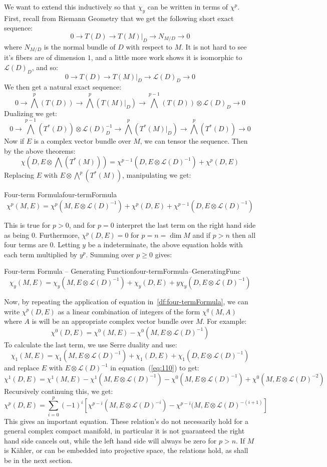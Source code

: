 \documentclass{book}
\newcommand{\CL}{{\mathcal{L}}}
\begin{document}
We want to extend this inductively so that $\chi_y$ can be written in terms of $\chi^p$. First, recall from
Riemann Geometry that we get the following short exact sequence:
\[
  0 \to T(D) \to T(M)|_D \to N_{M/D} \to 0
\]
where $N_{M/D}$ is the normal bundle of $D$ with respect to $M$. It is not hard to see it's fibers are of
dimension $1$, and a little more work shows it is isomorphic to $\CL(D)_D$, and so:
\[
  0 \to T(D) \to T(M)|_D \to \CL(D)_D \to 0
\]
We then get a natural exact sequence:
\[
0 \to \bigwedge^p\left(T(D)\right) \to \bigwedge^p(T(M)|_D) \to \bigwedge^{p-1}(T(D)) \otimes \CL(D)_D\to 0
\]
Dualizing we get:
\[
  0 \to \bigwedge^{p-1}(T^*(D))\otimes \CL(D)_D^{-1} \to \bigwedge^p(T^*(M)|_D) \to \bigwedge^p(T^*(D)) \to 0
\]
Now if $E$ is a complex vector bundle over $M$, we can tensor the sequence. Then by the above theorems:
\[
  \chi\left(D, E\otimes \bigwedge(T^*(M))\right) = \chi^{p-1}(D, E\otimes \CL(D)^{-1}) + \chi^p(D, E)
\]
Replacing $E$ with $E\otimes \bigwedge^p(T^*(M))$, manipulating we get:
\begin{defn}{Four-term Formula}{four-termFormula}
  \[
  \chi^p(M,E) = \chi^p(M, E\otimes \CL(D)^{-1}) + \chi^p(D, E) + \chi^{p-1}(D, E\otimes \CL(D)^{-1})
  \]
\end{defn}
This is true for $p>0$, and for $p=0$ interpret the last term on the right hand side as being $0$.
Furthermore, $\chi^p(D, E)=0$ for $p = n = \dim M$ and if $p > n$ then all four terms are $0$. Letting $y$ be
a indeterminate, the above equation holds with each term multiplied by $y^p$. Summing over $p\ge 0$ gives:
\begin{defn}{Four-term Formula -- Generating Function}{four-termFormula--GeneratingFunc}
  \[
  \chi_y(M,E) = \chi_y(M, E\otimes \CL(D)^{-1}) + \chi_y(D, E) + y\chi_y(D, E\otimes \CL(D)^{-1})
\]
\end{defn}


Now, by repeating the application of equation in~\cref{df:four-termFormula}, we can write $\chi^p(D,E)$ as a linear
combination of integers of the form $\chi^q(M, A)$ where $A$ is will be an appropriate complex vector bundle over $M$. For example:
\begin{equation}\label{eq:110}
  \chi^0(D, E) = \chi^0(M,E) - \chi^0(M, E\otimes \CL(D)^{-1})
\end{equation}
To calculate the last term, we use Serre duality and use:
\[
  \chi_1(M,E) = \chi_1(M, E\otimes \CL(D)^{-1}) + \chi_1(D, E) + \chi_1(D, E\otimes \CL(D)^{-1})
\]
and replace $E$ with $E\otimes \CL(D)^{-1}$ in equation~(\ref{eq:110}) to get:
\[
  \chi^1(D,E) = \chi^1(M, E) - \chi^1(M, E\otimes \CL(D)^{-1}) - \chi^0(M, E\otimes \CL(D)^{-1}) + \chi^0(M,
  E\otimes \CL(D)^{-2})
\]
Recursively continuing this, we get:
\[
  \chi^p(D, E) = \sum_{i=0}^p (-1)^i [\chi^{p-i}(M, E\otimes \CL(D)^{-i}) - \chi^{p-i}(M, E\otimes
  \CL(D)^{-(i+1)}]
\]
This gives an important equation. These relation's do not necessarily hold for a general complex compact
manifold, in particular it is not guaranteed the right hand side cancels out, while the left hand side
will always be zero for $p> n$. If $M$ is K\"ahler, or can be embedded into projective space, the relations
hold, as shall be in the next section.
\end{document}
